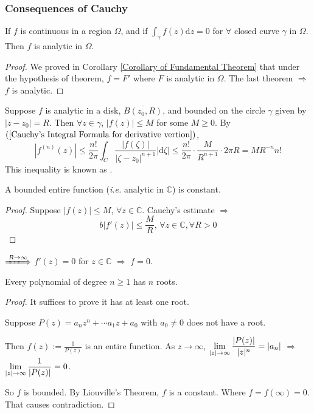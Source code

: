 \subsubsection{Consequences of Cauchy}
\begin{theorem}
    If  $ f $ is continuous in a region  $ \Omega $, and if  $ \int_\gamma f(z)\mathrm{d}z=0 $ for  $ \forall $ closed curve $ \gamma $ in  $ \Omega $. Then  $ f $ is analytic in   $ \Omega $.       
\end{theorem}
\begin{proof}
    We proved in Corollary \ref{Corollary of Fundamental Theorem} that under the hypothesis of theorem,  $ f=F' $ where  $ F $ is analytic in  $ \Omega $. The last theorem  $ \Rightarrow  $ $ f $ is analytic.
\end{proof}
Suppose  $ f $ is analytic in a disk, $ \overline{B(z_0,R)} $, and   bounded on the circle $ \gamma $ given by  $ |z-z_0|=R $. Then  $ \forall z\in \gamma $, $ |f(z)| \leq M $  for some  $ M \geq 0 $. By  $ (\ref{Cauchy's Integral Formula for derivative vertion}) $,
\begin{equation}
    |f^{(n)}(z)| \leq \frac{n!}{2\pi}\int_C\frac{|f(\zeta)|}{|\zeta-z_0|^{n+1}}|\mathrm{d}\zeta| \leq \frac{n!}{2\pi}\cdot\frac{M}{R^{n+1}}\cdot 2\pi R=MR^{-n}n!
\end{equation}    
This inequality is known as .
\begin{theorem}\label{Liouville's Theorem}
    A bounded entire function (\textit{i.e.} analytic in  $ \mathbb{C} $) is constant.
\end{theorem}
\begin{proof}
    Suppose  $ |f(z)| \leq M $, $ \forall z\in \mathbb{C} $. Cauchy's estimate $ \Rightarrow   $ 
    \begin{equation}b
        |f'(z)| \leq \frac{M}{R},\,\forall z\in \mathbb{C},\forall R>0
    \end{equation}  
\end{proof}
 $ \xLongrightarrow{R\to\infty}  $ $ f'(z)=0 $ for  $ z\in \mathbb{C} $   $ \Rightarrow  $ $ f=0 $.  
 \begin{theorem}
    Every polynomial of degree  $ n \geq 1 $ has  $ n $ roots.  
 \end{theorem}
\begin{proof}
    It suffices to prove it has at least one root.

    Suppose  $ P(z)=a_nz^n+\cdots a_1z+a_0 $ with  $ a_0\neq0 $ does not have a root.
    
    Then  $ f(z):=\frac{1}{P(z)} $ is an entire function. As  $ z\rightarrow \infty $,  $ \displaystyle\lim\limits_{|z|\to\infty}\frac{|P(z)|}{|z|^n}=|a_n| $ $ \Rightarrow  $ $ \displaystyle\lim\limits_{|z|\to\infty}\frac{1}{|P(z)|}=0 $.

    So  $ f $ is bounded. By Liouville's Theorem,  $ f  $ is a constant. Where  $ f=f(\infty)=0 $. That causes contradiction.   
\end{proof}
